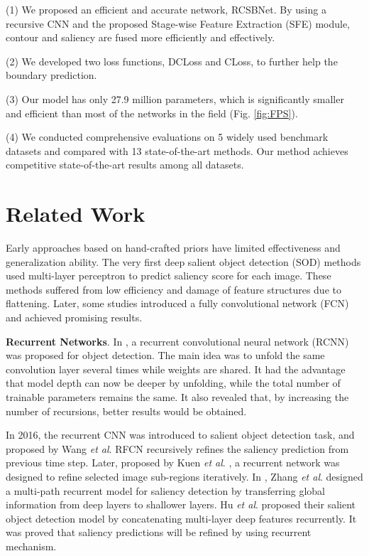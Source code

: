 \documentclass[10pt,twocolumn,letterpaper]{article}
\begin{document}
(1) We proposed an efficient and accurate network, RCSBNet. By using a recursive CNN and the proposed Stage-wise Feature Extraction (SFE) module, contour and saliency are fused more efficiently and effectively.

(2) We developed two loss functions, DCLoss and CLoss, to further help the boundary prediction.

(3) Our model has only 27.9 million parameters, which is significantly smaller and efficient than most of the networks in the field (Fig. \ref{fig:FPS}).

(4) We conducted comprehensive evaluations on 5 widely used benchmark datasets and compared with 13 state-of-the-art methods. Our method achieves competitive state-of-the-art results among all datasets.


\section{Related Work}
Early approaches based on hand-crafted priors \cite{GCSOD}\cite{SODMARKOV}\cite{DUTO} have limited effectiveness and generalization ability. The very first deep salient object detection (SOD) methods \cite{HKUIS}\cite{SODCONTEXT} used multi-layer perceptron to predict saliency score for each image.  These methods suffered from low efficiency and damage of feature structures due to flattening. Later, some studies introduced a fully convolutional network (FCN) and achieved promising results.

\textbf{Recurrent Networks}. In \cite{RCNN}, a recurrent convolutional neural network (RCNN) was proposed for object detection. The main idea was to unfold the same convolution layer several times while weights are shared. It had the advantage that model depth can now be deeper by unfolding, while the total number of trainable parameters remains the same. It also revealed that, by increasing the number of recursions, better results would be obtained. 

In 2016, the recurrent CNN was introduced to salient object detection task, and proposed by Wang \textit{et al}. RFCN \cite{RFCN} recursively refines the saliency prediction from previous time step. Later, proposed by Kuen \textit{et al}. \cite{RASA}, a recurrent network was designed to refine selected image sub-regions iteratively. In \cite{PAGRN}, Zhang \textit{et al}. designed a multi-path recurrent model for saliency detection by transferring global information from deep layers to shallower layers. Hu \textit{et al}.  \cite{RADF} proposed their salient object detection model by concatenating multi-layer deep features recurrently. It was proved that saliency predictions will be refined by using recurrent mechanism.
\end{document}
